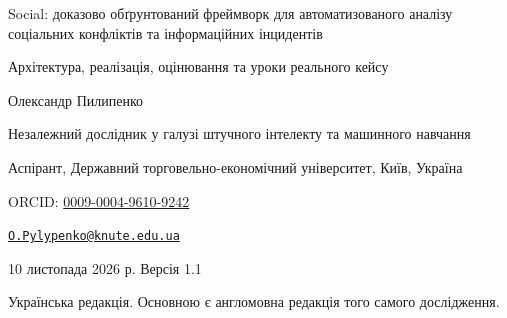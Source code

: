 \documentclass[11pt,a4paper]{article}
\begin{document}
\begin{center}
{\LARGE Social: доказово обґрунтований фреймворк для автоматизованого аналізу соціальних конфліктів та інформаційних інцидентів\par}
\vspace{0.4em}
{\large Архітектура, реалізація, оцінювання та уроки реального кейсу\par}
\vspace{0.8em}
{\large Олександр Пилипенко\par}
{\small Незалежний дослідник у галузі штучного інтелекту та машинного навчання\par}
{\small Аспірант, Державний торговельно-економічний університет, Київ, Україна\par}
{\small ORCID: \href{https://orcid.org/0009-0004-9610-9242}{0009-0004-9610-9242}\par}
{\small \href{mailto:O.Pylypenko@knute.edu.ua}{\texttt{O.Pylypenko@knute.edu.ua}}\par}
\vspace{0.4em}
10 листопада 2026 р. \textperiodcentered{} Версія 1.1\par
{\small Українська редакція. Основною є англомовна редакція того самого дослідження.\par}
\end{center}
\end{document}
